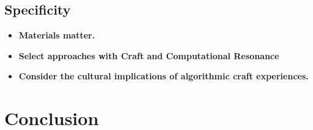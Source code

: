 \documentclass{sigchi}
\begin{document}
\subsection{Specificity}
\begin{itemize}
\item \textbf{Materials matter.} %

\item \textbf{Select approaches with Craft and Computational Resonance} %

\item \textbf{Consider the cultural implications of algorithmic craft experiences.} %
\end{itemize}

\section{Conclusion}
\balance




\end{document}

